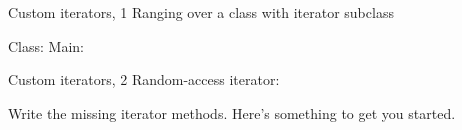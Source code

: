 \begin{block}{Custom iterators, 1}
  \label{sl:it-class-1}
  Ranging over a class with iterator subclass
  \begin{multicols}{2}
    Class:
    \columnbreak
    Main:
  \end{multicols}
\end{block}

\begin{block}{Custom iterators, 2}
  \label{sl:it-class-2}
  Random-access iterator:
\end{block}

\begin{exercise}
  \label{ex:it-class}
  Write the missing iterator methods.
  Here's something to get you started.
\end{exercise}


